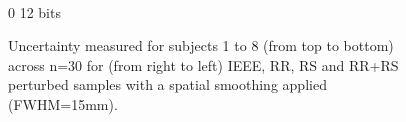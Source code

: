 \documentclass{article}
\begin{document}
\begin{appendices}
\begin{landscape}
\begin{figure}
\begin{subfigure}[t]{0.2\paperheight}
            \end{subfigure} \\
            \hspace*{6cm} 0  12 bits
            \caption{Uncertainty measured for subjects 1 to 8 (from top to bottom) across n=30 for
                (from right to left) IEEE, RR, RS and RR+RS perturbed samples with a spatial smoothing applied (FWHM=15mm). }
            \label{fig:uncertainty_15mm}

        \end{figure}
    \end{landscape}

    \begin{landscape}
        \begin{figure}


\end{figure}
\end{landscape}
\end{appendices}
\end{document}
